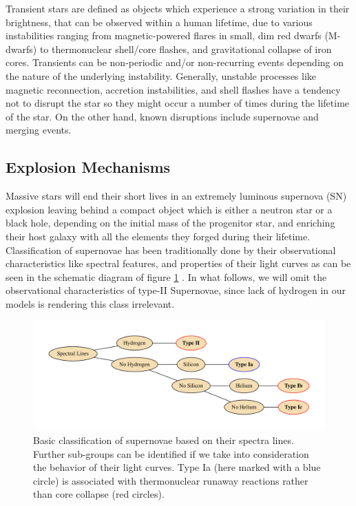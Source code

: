 \documentclass[../../main/thesis_msc.tex]{subfiles}
\begin{document}
		
		Transient stars are defined as objects which experience a strong variation in their brightness, that can be observed within a human lifetime, due to various instabilities ranging from magnetic-powered flares in small, dim red dwarfs (M-dwarfs) to thermonuclear shell/core flashes, and gravitational collapse of iron cores. Transients can be non-periodic and/or non-recurring events depending on the nature of the underlying instability. Generally, unstable processes like magnetic reconnection, accretion instabilities, and shell flashes have a tendency not to disrupt the star so they might occur a number of times during the lifetime of the star. On the other hand, known disruptions include supernovae and merging events. 
		
			\subsection{Explosion Mechanisms}
			
				
				Massive stars will end their short lives in an extremely luminous supernova (SN) explosion leaving behind a compact object which is either a neutron star or a black hole, depending on the initial mass of the progenitor star, and enriching their host galaxy with all the elements they forged during their lifetime. Classification of supernovae has been traditionally done by their observational characteristics like spectral features, and properties of their light curves as can be seen in the schematic diagram of figure \ref{fig:SNe_classification} \citep[see][]{Filippenko1997, Turatto2003}. In what follows, we will omit the observational characteristics of type-II Supernovae, since lack of hydrogen in our models is rendering this class irrelevant. 
				
				\begin{figure}[h]
					\centering
					\includegraphics[width = \textwidth]{../figures/chapter1/SNeClass.pdf}
					\caption{Basic classification of supernovae based on their spectra lines. Further sub-groups can be identified if we take into consideration the behavior of their light curves. Type Ia (here marked with a blue circle) is associated with thermonuclear runaway reactions rather than core collapse (red circles).}
					\label{fig:SNe_classification}
				\end{figure}
				
\end{document}
